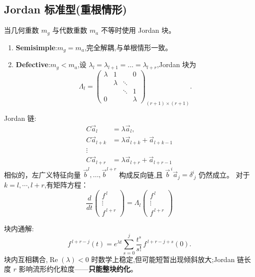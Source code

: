 \documentclass[11pt,a4paper]{article}
\newcommand{\diff}[2]{\dfrac{d #1}{d #2}}
\DeclareMathOperator{\Real}{Re}
\begin{document}
\subsection{Jordan 标准型(重根情形)}

当几何重数 $m_g$ 与代数重数 $m_a$ 不等时使用 Jordan 块。
\begin{enumerate}[label=(\arabic*)]
\item \textbf{Semisimple}:$m_g=m_a$,完全解耦,与单根情形一致。
\item \textbf{Defective}:$m_g<m_a$,设 $\lambda_l=\lambda_{l+1}=\dots=\lambda_{l+r}$,Jordan 块为
\begin{equation}
\Lambda_l=\begin{pmatrix}\lambda & 1 & & 0\\ & \lambda & \ddots & \\ & & \ddots & 1\\ 0 & & & \lambda\end{pmatrix}_{(r+1)\times(r+1)}.
\end{equation}
\end{enumerate}

Jordan 链:
\begin{align}
	C\vec a_l&=\lambda\vec a_l,\nonumber\\
	C\vec a_{l+k}&=\lambda\vec a_{l+k}+\vec a_{l+k-1}\nonumber\\
	\vdots & \nonumber\\
	C\vec a_{l+r}&=\lambda\vec a_{l+r}+\vec a_{l+r-1}
\end{align}
相似的，左广义特征向量 $\vec b^{l},\dots,\vec b^{l+r}$ 构成反向链,且 $\vec b^{\,i}\vec a_j=\delta^{i}_{\;j}$ 仍然成立。
对于$k=l,\cdots, l+r$,有矩阵方程：
\begin{equation}
	\diff{}{t}\begin{pmatrix}f^{\,l}\\\vdots\\ f^{\,l+r}\end{pmatrix}=\Lambda_l\begin{pmatrix}f^{\,l}\\\vdots \\f^{\,l+r}\end{pmatrix}
\end{equation}

块内通解:
\begin{equation}
f^{\,l+r-j}(t)=e^{\lambda t}\sum_{s=0}^{j}\frac{t^{s}}{s!}\,f^{\,l+r-j+s}(0).
\end{equation}
块内互相耦合,$\Real(\lambda)<0$ 时数学上稳定,但可能短暂出现倾斜放大;Jordan 链长度 $r$ 影响流形约化粒度——\textbf{只能整块约化}。
\end{document}

